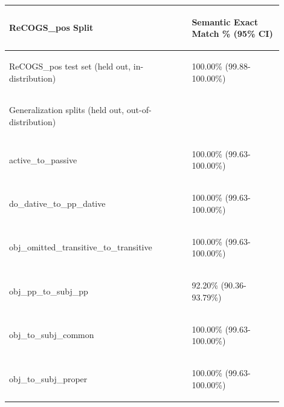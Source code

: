 \documentclass[11pt]{article}
\begin{document}
\begin{table}
\centering
\begin{tabular}{p{0.6\linewidth} p{0.3\linewidth}}
\hline
\begin{tiny}\textbf{ReCOGS\_pos Split}\end{tiny} & \begin{tiny}\textbf{Semantic Exact Match \% (95\% CI)}\end{tiny} \\
\hline
\begin{tiny}ReCOGS\_pos test set (held out, in-distribution)\end{tiny} & \begin{tiny} 100.00\% (99.88-100.00\%)\end{tiny} \\
\hline
\begin{tiny}Generalization splits (held out, out-of-distribution)\end{tiny} & \\
\hline
\begin{tiny}active\_to\_passive\end{tiny} & \begin{tiny}100.00\% (99.63-100.00\%)\end{tiny} \\
\begin{tiny}do\_dative\_to\_pp\_dative\end{tiny} & \begin{tiny} 100.00\% (99.63-100.00\%)\end{tiny} \\
\begin{tiny}obj\_omitted\_transitive\_to\_transitive\end{tiny} & \begin{tiny} 100.00\% (99.63-100.00\%)\end{tiny} \\
\begin{tiny}obj\_pp\_to\_subj\_pp\end{tiny} & \begin{tiny}  92.20\% (90.36- 93.79\%)\end{tiny} \\
\begin{tiny}obj\_to\_subj\_common\end{tiny} & \begin{tiny} 100.00\% (99.63-100.00\%)\end{tiny} \\
\begin{tiny}obj\_to\_subj\_proper\end{tiny} & \begin{tiny} 100.00\% (99.63-100.00\%)\end{tiny} \\

\end{tabular}
\end{table}
\end{document}
